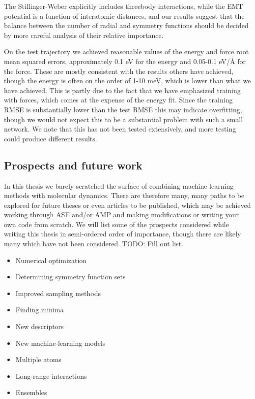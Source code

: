 The Stillinger-Weber explicitly includes threebody interactions,
while the EMT potential is a function of interatomic distances, and our
results suggest that the balance between the number of radial and symmetry functions
should be decided by more careful analysis of their relative importance.
\par
On the test trajectory we achieved reasonable values of the energy and force
root mean squared errors, approximately 0.1 eV for the energy and 0.05-0.1 eV/Å
for the force. These are mostly consistent with the results others have achieved,
though the energy is often on the order of 1-10 meV, which is lower than
what we have achieved. This is partly due to the fact that we have emphasized
training with forces, which comes at the expense of the energy fit.
Since the training RMSE is substantially lower than the test RMSE this may
indicate overfitting, though we would not expect this to be a substantial problem
with such a small network. We note that this has not been tested extensively,
and more testing could produce different results.

\subsection{Prospects and future work}
In this thesis we barely scratched the surface of combining machine learning
methods with molecular dynamics. There are therefore many, many paths
to be explored for future theses or even articles to be published,
which may be achieved working through ASE and/or AMP and making modifications
or writing your own code from scratch. We will list some of the prospects
considered while writing this thesis in semi-ordered order of importance,
though there are likely many which have not been considered.
TODO: Fill out list.

\begin{itemize}
    \item Numerical optimization
    \item Determining symmetry function sets
    \item Improved sampling methods
    \item Finding minima
    \item New descriptors
    \item New machine-learning models
    \item Multiple atoms
    \item Long-range interactions
    \item Ensembles
\end{itemize}

